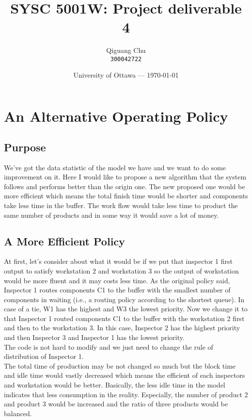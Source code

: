 \documentclass{article}
\title{SYSC 5001W: Project deliverable 4} %
\author{Qiguang Chu\\ \texttt{300042722}} %
\date{University of Ottawa --- \today} %
\begin{document}
\maketitle

\section{An Alternative Operating Policy}
\subsection{Purpose}
We've got the data statistic of the model we have and we want to do some improvement on it. Here I would like to propose a new algorithm that the system follows and performs better than the origin one. The new proposed one would be more efficient which means the total finish time would be shorter and components take less time in the buffer. The work flow would take less time to product the same number of products and in some way it would save a lot of money.

\subsection{A More Efficient Policy}
At first, let's consider about what it would be if we put that inspector 1 first output to satisfy workstation 2 and workstation 3 so the output of workstation would be more fluent and it may costs less time. As the original policy said, Inspector 1 routes components C1 to the buffer with the smallest number of components in waiting (i.e., a routing policy according to the shortest queue). In case of a tie, W1 has the highest and W3 the lowest priority. Now we change it to that Inspector 1 routed components C1 to the buffer with the workstation 2 first and then to the workstation 3. In this case, Inspector 2 has the highest priority and then Inspector 3 and Inspector 1 has the lowest priority. \\
The code is not hard to modify and we just need to change the rule of distribution of Inspector 1.\\
The total time of production may be not changed so much but the block time and idle time would vastly decreased which means the efficient of each inspectors and workstation would be better. Basically, the less idle time in the model indicates that less consumption in the reality. Especially, the number of product 2 and product 3 would be increased and the ratio of three products would be balanced.\\
\end{document}

